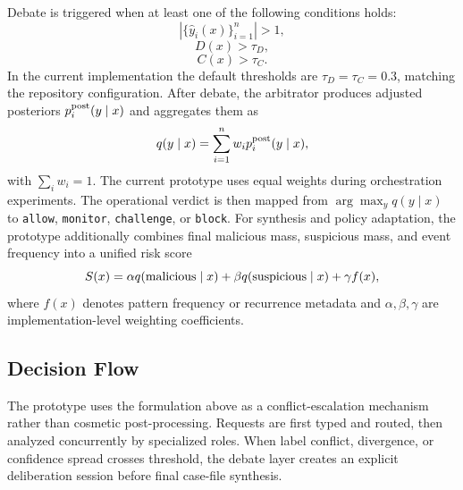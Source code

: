 \documentclass{ieeeaccess}
\begin{document}
Debate is triggered when at least one of the following conditions holds:
\begin{equation}
\left| \{ \hat{y}_i(x) \}_{i=1}^{n} \right| > 1,
\end{equation}
\begin{equation}
D(x) > \tau_D,
\end{equation}
\begin{equation}
C(x) > \tau_C.
\end{equation}
In the current implementation the default thresholds are $\tau_D=\tau_C=0.3$, matching the repository configuration. After debate, the arbitrator produces adjusted posteriors $p_i^{\textnormal{post}}(y \mid x)$ and aggregates them as
\begin{equation}
q(y \mid x)=\sum_{i=1}^{n} w_i p_i^{\textnormal{post}}(y \mid x),
\end{equation}
with $\sum_i w_i=1$. The current prototype uses equal weights during orchestration experiments. The operational verdict is then mapped from $\arg\max_y q(y \mid x)$ to \texttt{allow}, \texttt{monitor}, \texttt{challenge}, or \texttt{block}. For synthesis and policy adaptation, the prototype additionally combines final malicious mass, suspicious mass, and event frequency into a unified risk score
\begin{equation}
S(x)=\alpha q(\textnormal{malicious} \mid x)+\beta q(\textnormal{suspicious} \mid x)+\gamma f(x),
\end{equation}
where $f(x)$ denotes pattern frequency or recurrence metadata and $\alpha,\beta,\gamma$ are implementation-level weighting coefficients.

\subsection{Decision Flow}
The prototype uses the formulation above as a conflict-escalation mechanism rather than cosmetic post-processing. Requests are first typed and routed, then analyzed concurrently by specialized roles. When label conflict, divergence, or confidence spread crosses threshold, the debate layer creates an explicit deliberation session before final case-file synthesis.
\end{document}
